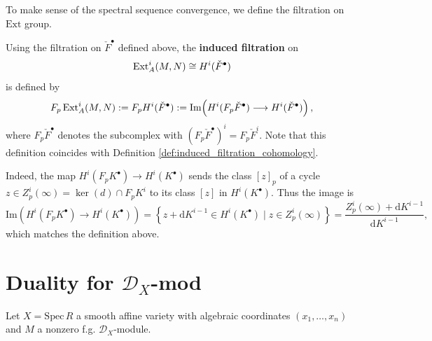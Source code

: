 \begin{remark}\label{rmk:induced-filtration-on-Ext}
    \mbox{}

    To make sense of the spectral sequence convergence, we define the filtration on $\mathrm{Ext}$ group.

    Using the filtration on $\check{F}^\bullet$ defined above, the \textbf{induced filtration} on
    \[
        \operatorname{Ext}_A^i(M,N)\cong H^i(\check{F}^\bullet)
    \]
    is defined by
    \[
        F_p\operatorname{Ext}_A^i(M,N)
        := F_pH^i(\check{F}^\bullet)
        := \mathrm{Im}\!\left(H^i(F_p\check{F}^\bullet)\longrightarrow H^i(\check{F}^\bullet)\right),
    \]
    where $F_p\check{F}^\bullet$ denotes the subcomplex with $(F_p\check{F}^\bullet)^i=F_p\check{F}^i$.
    Note that this definition coincides with Definition \ref{def:induced_filtration_cohomology}.

    Indeed, the map $H^i(F_pK^\bullet) \to H^i(K^\bullet)$ sends the class $[z]_p$ of a cycle $z \in Z_p^i(\infty) = \ker(d) \cap F_p K^i$ to its class $[z]$ in $H^i(K^\bullet)$.
    Thus the image is
    \[
        \mathrm{Im}\!\left(H^i(F_pK^\bullet)\longrightarrow H^i(K^\bullet)\right) = \left\{ z + \mathrm{d}K^{i-1} \in H^i(K^\bullet) \mid z \in Z_p^i(\infty) \right\} = \frac{Z_p^i(\infty) + \mathrm{d}K^{i-1}}{\mathrm{d}K^{i-1}},
    \]
    which matches the definition above.
\end{remark}


\section{Duality for $\mathcal{D}_{X}$-mod}

Let $X = \mathrm{Spec}\, R$ a smooth affine variety with algebraic coordinates $(x_1, \ldots, x_n)$ and $M$ a nonzero f.g. $\mathcal{D}_X$-module.

